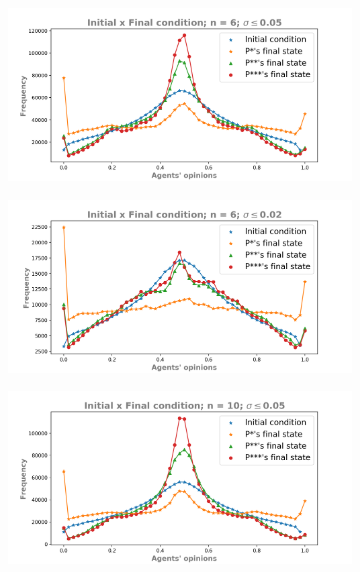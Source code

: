 \documentclass{article}
\begin{document}
\begin{figure}[H]
  
    \begin{subfigure}[b]{0.49\textwidth}
      \includegraphics[width=\textwidth]{img/oiks/oiks_smallsigma005_n6.png}
    \end{subfigure}
    \begin{subfigure}[b]{0.49\textwidth}
      \includegraphics[width=\textwidth]{img/oiks/oiks_smallsigma002_n6.png}
    \end{subfigure}
     \begin{subfigure}[b]{0.49\textwidth}
       \includegraphics[width=\textwidth]{img/oiks/oiks_smallsigma005_n10.png}

\end{subfigure}
\end{figure}
\end{document}
